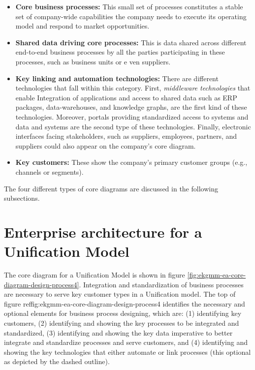 \begin{itemize}
    \item \textbf{Core business processes:} This small set of processes constitutes a stable set of company-wide
    capabilities the company needs to execute its operating model and respond to market opportunities.
    \item \textbf{Shared data driving core processes:} This is data shared across different end-to-end
    business processes by all the parties participating in these processes, such as business units or e
    ven suppliers.
    \item \textbf{Key linking and automation technologies:} There are different technologies that fall within
    this category.
    First, \textit{middleware technologies} that enable Integration of applications and access to shared data
    such as ERP packages, data-warehouses, and knowledge graphs, are the first kind of these technologies.
    Moreover, portals providing standardized access to systems and data and systems are the second type of
    these technologies.
    Finally, electronic interfaces facing stakeholders, such as suppliers, employees, partners, and suppliers
    could also appear on the company’s core diagram.
    \item \textbf{Key customers:} These show the company's primary customer groups (e.g., channels or segments).
\end{itemize}

The four different types of core diagrams are discussed in the following subsections.

\section*{Enterprise architecture for a Unification Model}

The core diagram for a Unification Model is shown in figure \ref{fig:ekgmm-ea-core-diagram-design-process4}.
Integration and standardization of business processes are necessary to serve key customer types in a Unification model.
The top of figure ref{fig:ekgmm-ea-core-diagram-design-process4} identifies the necessary and optional elements
for business process designing, which are:
(1) identifying key customers,
(2) identifying and showing the key processes to be integrated and standardized,
(3) identifying and showing the key data imperative to better integrate and standardize processes and serve customers, and
(4) identifying and showing the key technologies that either automate or link processes (this optional as depicted
by the dashed outline).


